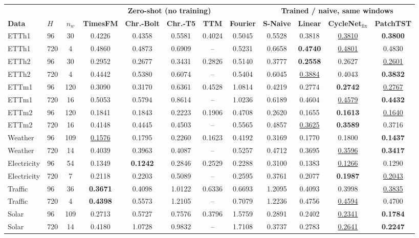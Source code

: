 \begin{tabular}{llcccccccccc}
\toprule
& & & \multicolumn{5}{c}{\textbf{Zero-shot (no training)}} & \multicolumn{4}{c}{\textbf{Trained / naive, same windows}} \\
\cmidrule(lr){4-8} \cmidrule(lr){9-12}
\textbf{Data} & $H$ & $n_w$ & \textbf{TimesFM} & \textbf{Chr.-Bolt} & \textbf{Chr.-T5} & \textbf{TTM} & \textbf{Fourier} & \textbf{S-Naive} & \textbf{Linear} & \textbf{CycleNet$_{\text{fix}}$} & \textbf{PatchTST} \\
\midrule
ETTh1 & 96 & 30 & 0.4226 & 0.4358 & 0.5581 & 0.4024 & 0.5045 & 0.5528 & 0.3818 & \underline{0.3810} & \textbf{0.3800} \\
ETTh1 & 720 & 4 & 0.4860 & 0.4873 & 0.6909 & -- & 0.5231 & 0.6658 & \textbf{0.4740} & \underline{0.4801} & 0.4830 \\
ETTh2 & 96 & 30 & 0.2952 & 0.2677 & 0.3431 & 0.2826 & 0.5140 & 0.3777 & \textbf{0.2558} & 0.2627 & \underline{0.2601} \\
ETTh2 & 720 & 4 & 0.4442 & 0.5380 & 0.6074 & -- & 0.5404 & 0.6045 & \underline{0.3884} & 0.4043 & \textbf{0.3832} \\
ETTm1 & 96 & 120 & 0.3090 & 0.3170 & 0.6361 & 0.4528 & 1.0814 & 0.4219 & 0.2774 & \textbf{0.2742} & \underline{0.2767} \\
ETTm1 & 720 & 16 & 0.5053 & 0.5794 & 0.8614 & -- & 1.0236 & 0.6189 & 0.4604 & \underline{0.4579} & \textbf{0.4432} \\
ETTm2 & 96 & 120 & 0.1841 & 0.1843 & 0.2223 & 0.1906 & 0.4708 & 0.2620 & 0.1655 & \textbf{0.1613} & \underline{0.1640} \\
ETTm2 & 720 & 16 & 0.4148 & 0.4445 & 0.4503 & -- & 0.5565 & 0.4857 & \underline{0.3625} & \textbf{0.3589} & 0.3716 \\
Weather & 96 & 109 & \underline{0.1576} & 0.1795 & 0.2260 & 0.1623 & 0.4192 & 0.3169 & 0.1770 & 0.1800 & \textbf{0.1437} \\
Weather & 720 & 14 & 0.4039 & 0.3963 & 0.4087 & -- & 0.5257 & 0.4712 & 0.3695 & \underline{0.3596} & \textbf{0.3417} \\
Electricity & 96 & 54 & 0.1349 & \textbf{0.1242} & 0.2846 & 0.2529 & 0.2288 & 0.3100 & 0.1383 & \underline{0.1266} & 0.1290 \\
Electricity & 720 & 7 & 0.2118 & 0.2203 & 0.5089 & -- & 0.2595 & 0.3761 & 0.2077 & \textbf{0.1987} & \underline{0.2043} \\
Traffic & 96 & 36 & \textbf{0.3671} & 0.4098 & 1.0122 & 0.6336 & 0.6693 & 1.2095 & 0.4093 & 0.3998 & \underline{0.3835} \\
Traffic & 720 & 4 & \textbf{0.4398} & 0.5573 & 1.2105 & -- & 0.7079 & 1.2236 & 0.4756 & \underline{0.4594} & 0.4700 \\
Solar & 96 & 109 & 0.2713 & 0.5727 & 0.7576 & 0.3796 & 1.5759 & 0.2891 & 0.2402 & \underline{0.2341} & \textbf{0.1784} \\
Solar & 720 & 14 & 0.4180 & 1.0728 & 0.9832 & -- & 1.7108 & 0.3737 & 0.2783 & \underline{0.2641} & \textbf{0.2247} \\
\bottomrule
\end{tabular}
